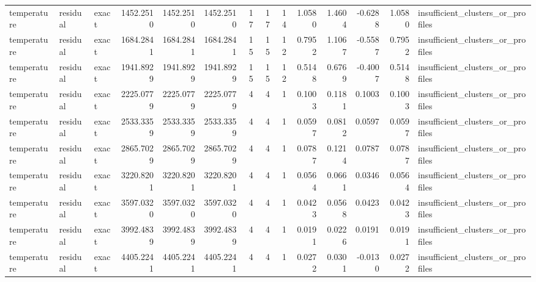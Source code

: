 \begin{tabular}{lllrrrrrrrrrrl}
temperature & residual & exact & 1452.2510 & 1452.2510 & 1452.2510 & 17 & 17 & 14 & 1.0580 & 1.4604 & -0.6288 & 1.0580 & insufficient_clusters_or_profiles \\
temperature & residual & exact & 1684.2841 & 1684.2841 & 1684.2841 & 15 & 15 & 12 & 0.7952 & 1.1067 & -0.5587 & 0.7952 & insufficient_clusters_or_profiles \\
temperature & residual & exact & 1941.8929 & 1941.8929 & 1941.8929 & 15 & 15 & 12 & 0.5148 & 0.6769 & -0.4007 & 0.5148 & insufficient_clusters_or_profiles \\
temperature & residual & exact & 2225.0779 & 2225.0779 & 2225.0779 & 4 & 4 & 1 & 0.1003 & 0.1181 & 0.1003 & 0.1003 & insufficient_clusters_or_profiles \\
temperature & residual & exact & 2533.3359 & 2533.3359 & 2533.3359 & 4 & 4 & 1 & 0.0597 & 0.0812 & 0.0597 & 0.0597 & insufficient_clusters_or_profiles \\
temperature & residual & exact & 2865.7029 & 2865.7029 & 2865.7029 & 4 & 4 & 1 & 0.0787 & 0.1214 & 0.0787 & 0.0787 & insufficient_clusters_or_profiles \\
temperature & residual & exact & 3220.8201 & 3220.8201 & 3220.8201 & 4 & 4 & 1 & 0.0564 & 0.0661 & 0.0346 & 0.0564 & insufficient_clusters_or_profiles \\
temperature & residual & exact & 3597.0320 & 3597.0320 & 3597.0320 & 4 & 4 & 1 & 0.0423 & 0.0568 & 0.0423 & 0.0423 & insufficient_clusters_or_profiles \\
temperature & residual & exact & 3992.4839 & 3992.4839 & 3992.4839 & 4 & 4 & 1 & 0.0191 & 0.0226 & 0.0191 & 0.0191 & insufficient_clusters_or_profiles \\
temperature & residual & exact & 4405.2241 & 4405.2241 & 4405.2241 & 4 & 4 & 1 & 0.0272 & 0.0301 & -0.0130 & 0.0272 & insufficient_clusters_or_profiles \\
\bottomrule
\end{tabular}
